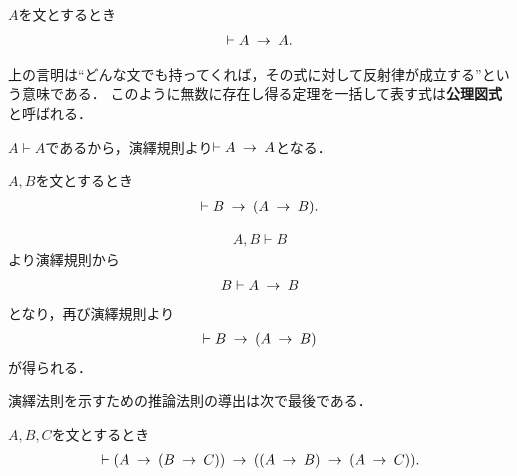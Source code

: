	\begin{screen}
		\begin{logicalthm}[含意の反射律]\label{logicalthm:reflective_law_of_implication}
			$A$を文とするとき
			\begin{align}
				\vdash A \hspace{0.25em}\rightarrow\hspace{0.25em} A.
			\end{align}
		\end{logicalthm}
	\end{screen}
	
	上の言明は``どんな文でも持ってくれば，その式に対して反射律が成立する''という意味である．
	このように無数に存在し得る定理を一括して表す式は{\bf 公理図式}と呼ばれる．
	
	\begin{prf}
		$A \vdash A$であるから，演繹規則より$\vdash A \hspace{0.25em}\rightarrow\hspace{0.25em} A$となる．
		\QED
	\end{prf}
	
	\begin{screen}
		\begin{logicalthm}[含意の導入]\label{logicalthm:rule_of_inference_2}
			$A,B$を文とするとき
			\begin{align}
				\vdash B \hspace{0.25em}\rightarrow\hspace{0.25em} (A \hspace{0.25em}\rightarrow\hspace{0.25em} B).
			\end{align}
		\end{logicalthm}
	\end{screen}
	
	\begin{prf}
		\begin{align}
			A,B \vdash B
		\end{align}
		より演繹規則から
		\begin{align}
			B \vdash A \hspace{0.25em}\rightarrow\hspace{0.25em} B
		\end{align}
		となり，再び演繹規則より
		\begin{align}
			\vdash B \hspace{0.25em}\rightarrow\hspace{0.25em} (A \hspace{0.25em}\rightarrow\hspace{0.25em} B)
		\end{align}
		が得られる．
		\QED
	\end{prf}
	
	演繹法則を示すための推論法則の導出は次で最後である．
	
	\begin{screen}
		\begin{logicalthm}[含意の分配則]
		\label{logicalthm:distributive_law_of_implication}
			$A,B,C$を文とするとき
			\begin{align}
				\vdash (A \hspace{0.25em}\rightarrow\hspace{0.25em} (B \hspace{0.25em}\rightarrow\hspace{0.25em} C)) \hspace{0.25em}\rightarrow\hspace{0.25em} ((A \hspace{0.25em}\rightarrow\hspace{0.25em} B) \hspace{0.25em}\rightarrow\hspace{0.25em} (A \hspace{0.25em}\rightarrow\hspace{0.25em} C)).
			\end{align}
		\end{logicalthm}
	\end{screen}
	
